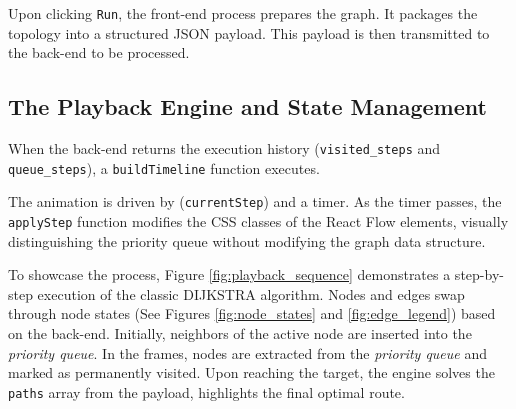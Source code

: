 Upon clicking \texttt{Run}, the front-end process prepares the graph. It packages the topology into a structured JSON payload. This payload is then transmitted to the back-end to be processed. 


\subsection{The Playback Engine and State Management}
\label{subsec:playback_engine}

When the back-end returns the execution history (\texttt{visited\_steps} and \newline \texttt{queue\_steps}), a \texttt{buildTimeline} function executes. 

The animation is driven by (\texttt{currentStep}) and a timer. As the timer passes, the \texttt{applyStep} function modifies the CSS classes of the React Flow elements, visually distinguishing the priority queue without modifying the graph data structure.

To showcase the process, Figure \ref{fig:playback_sequence} demonstrates a step-by-step execution of the classic \textsc{DIJKSTRA} algorithm. Nodes and edges swap through node states (See Figures \ref{fig:node_states} and \ref{fig:edge_legend}) based on the back-end. Initially, neighbors of the active node are inserted into the \textit{priority queue}. In the  frames, nodes are extracted from the \textit{priority queue} and marked as permanently visited. Upon reaching the target, the engine solves the \texttt{paths} array from the payload, highlights the final optimal route.

